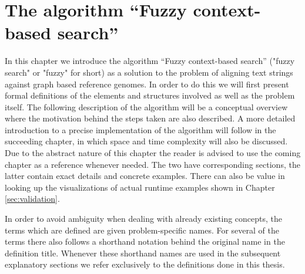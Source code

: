 \documentclass[thesis.tex]{subfiles}
\begin{document}
\chapter{The algorithm ``Fuzzy context-based search''}
{\parindent0pt
In this chapter we introduce the algorithm ``Fuzzy context-based search'' ("fuzzy search" or "fuzzy" for short) as a solution to the problem of aligning text strings against graph based reference genomes. In order to do this we will first present formal definitions of the elements and structures involved as well as the problem itself. The following description of the algorithm will be a conceptual overview where the motivation behind the steps taken are also described. A more detailed introduction to a precise implementation of the algorithm will follow in the succeeding chapter, in which space and time complexity will also be discussed. Due to the abstract nature of this chapter the reader is advised to use the coming chapter as a reference whenever needed. The two have corresponding sections, the latter contain exact details and concrete examples. There can also be value in looking up the visualizations of actual runtime examples shown in Chapter \ref{sec:validation}.\\
\par\noindent
In order to avoid ambiguity when dealing with already existing concepts, the terms which are defined are given problem-specific names. For several of the terms there also follows a shorthand notation behind the original name in the definition title. Whenever these shorthand names are used in the subsequent explanatory sections we refer exclusively to the definitions done in this thesis.
}
\end{document}
